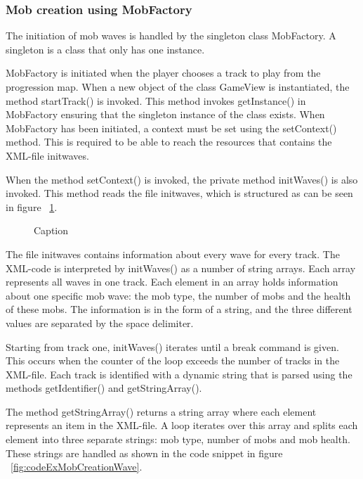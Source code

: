 \subsubsection{Mob creation using MobFactory}

The initiation of mob waves is handled by the singleton class MobFactory. A singleton is a class that only has one instance. \citep{designPatterns}

MobFactory is initiated when the player chooses a track to play from the progression map. When a new object of the class GameView is instantiated, the method startTrack() is invoked. This method invokes getInstance() in MobFactory ensuring that the singleton instance of the class exists. When MobFactory has been initiated, a context must be set using the setContext() method. This is required to be able to reach the resources that contains the XML-file initwaves.

When the method setContext() is invoked, the private method initWaves() is also invoked. This method reads the file initwaves, which is structured as can be seen in figure ~\ref{fig:codeExInitWavesXML}.


\begin{figure}[htb]

\begin{small}

\end{small}

\caption{Caption}
\label{fig:codeExInitWavesXML}

\end{figure}

The file initwaves contains information about every wave for every track. The XML-code is interpreted by initWaves() as a number of string arrays. Each array represents all waves in one track. Each element in an array holds information about one specific mob wave: the mob type, the number of mobs and the health of these mobs. The information is in the form of a string, and the three different values are separated by the space delimiter.

Starting from track one, initWaves() iterates until a break command is given. This occurs when the counter of the loop exceeds the number of tracks in the XML-file. Each track is identified with a dynamic string that is parsed using the methods getIdentifier() and getStringArray().

The method getStringArray() returns a string array where each element represents an item in the XML-file. A loop iterates over this array and splits each element into three separate strings: mob type, number of mobs and mob health. These strings are handled as shown in the code snippet in figure ~\ref{fig:codeExMobCreationWave}.

